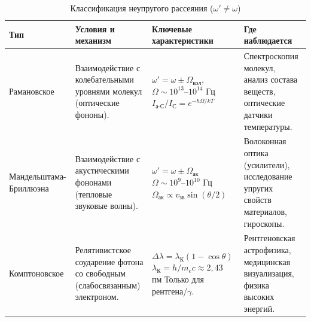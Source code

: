 \documentclass[12pt, a4paper]{article}
\begin{document}
\begin{table}[H]
\centering
\small
\renewcommand{\arraystretch}{1.3}

\label{tab:inelastic}
\begin{tabular}{|l|p{3.5cm}|p{3.5cm}|p{3.5cm}|}
\hline
\textbf{Тип} & \textbf{Условия и механизм} & \textbf{Ключевые характеристики} & \textbf{Где наблюдается} \\
\hline
Рамановское & Взаимодействие с колебательными уровнями молекул (оптические фононы). & $\omega' = \omega \pm \Omega_{\text{кол}}$, \newline $\Omega \sim 10^{13}\text{--}10^{14}$ Гц \newline $I_{\text{а-С}}/I_{\text{С}} = e^{-\hbar\Omega/kT}$ & Спектроскопия молекул, анализ состава веществ, оптические датчики температуры. \\
\hline
Мандельштама-Бриллюэна & Взаимодействие с акустическими фононами (тепловые звуковые волны). & $\omega' = \omega \pm \Omega_{\text{ак}}$ \newline $\Omega \sim 10^{9}\text{--}10^{10}$ Гц \newline $\Omega_{\text{ак}} \propto v_{\text{зв}} \sin(\theta/2)$ & Волоконная оптика (усилители), исследование упругих свойств материалов, гироскопы. \\
\hline
Комптоновское & Релятивистское соударение фотона со свободным (слабосвязанным) электроном. & $\Delta\lambda = \lambda_{\text{К}}(1-\cos\theta)$ \newline $\lambda_{\text{К}} = h/m_e c \approx 2,43$ пм \newline Только для рентгена/$\gamma$. & Рентгеновская астрофизика, медицинская визуализация, физика высоких энергий. \\
\hline
\end{tabular}
\caption{Классификация неупругого рассеяния ($\omega' \neq \omega$)}
\end{table}







\end{document}

